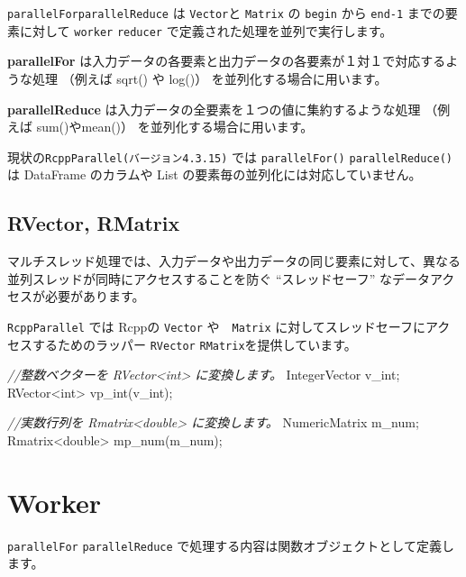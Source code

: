 \documentclass[]{book}
\newenvironment{Shaded}{\begin{snugshade}}{\end{snugshade}}
\newcommand{\CommentTok}[1]{\textcolor[rgb]{0.56,0.35,0.01}{\textit{#1}}}
\newcommand{\DataTypeTok}[1]{\textcolor[rgb]{0.13,0.29,0.53}{#1}}
\newcommand{\NormalTok}[1]{#1}
\newcommand{\VariableTok}[1]{\textcolor[rgb]{0.00,0.00,0.00}{#1}}
\begin{document}
\texttt{parallelFor\textasciigrave{}\textasciigrave{}parallelReduce} は \texttt{Vector}と \texttt{Matrix} の \texttt{begin} から \texttt{end-1} までの要素に対して \texttt{worker} \texttt{reducer} で定義された処理を並列で実行します。

\textbf{parallelFor} は入力データの各要素と出力データの各要素が１対１で対応するような処理 （例えば sqrt() や log()） を並列化する場合に用います。

\textbf{parallelReduce} は入力データの全要素を１つの値に集約するような処理 （例えば sum()やmean()） を並列化する場合に用います。

現状の\texttt{RcppParallel(バージョン4.3.15)} では \texttt{parallelFor()} \texttt{parallelReduce()} は DataFrame のカラムや List の要素毎の並列化には対応していません。

\hypertarget{rvector-rmatrix}{%
\subsection{RVector, RMatrix}\label{rvector-rmatrix}}

マルチスレッド処理では、入力データや出力データの同じ要素に対して、異なる並列スレッドが同時にアクセスすることを防ぐ ``スレッドセーフ'' なデータアクセスが必要があります。

\texttt{RcppParallel} では Rcppの \texttt{Vector} や　\texttt{Matrix} に対してスレッドセーフにアクセスするためのラッパー \texttt{RVector} \texttt{RMatrix}を提供しています。

\begin{Shaded}
\begin{Highlighting}[]
\CommentTok{//整数ベクターを RVector<int> に変換します。}
\NormalTok{IntegerVector v_int;}
\NormalTok{RVector<}\DataTypeTok{int}\NormalTok{> vp_int(v_int);}

\CommentTok{//実数行列を Rmatrix<double> に変換します。}
\NormalTok{NumericMatrix }\VariableTok{m_num}\NormalTok{;}
\NormalTok{Rmatrix<}\DataTypeTok{double}\NormalTok{> mp_num(}\VariableTok{m_num}\NormalTok{);}
\end{Highlighting}
\end{Shaded}

\hypertarget{worker}{%
\section{Worker}\label{worker}}

\texttt{parallelFor} \texttt{parallelReduce} で処理する内容は関数オブジェクトとして定義します。
\end{document}
